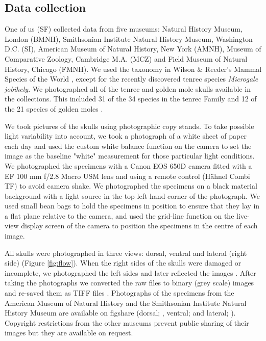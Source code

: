 \documentclass[12pt,a4paper]{article}
\begin{document}
\subsection{Data collection}
	One of us (SF) collected data from five museums: Natural History Museum, London (BMNH), Smithsonian Institute Natural History Museum, Washington D.C. (SI), American Museum of Natural History, New York (AMNH), Museum of Comparative Zoology, Cambridge M.A. (MCZ) and Field Museum of Natural History, Chicago (FMNH). We used the taxonomy in Wilson \& Reeder's Mammal Species of the World \citeyearpar{Wilson2005}, except for the recently discovered tenrec species \textit{Microgale jobihely}. We photographed all of the tenrec and golden mole skulls available in the collections. This included 31 of the 34 species in the tenrec Family \citep{Olson2013} and 12 of the 21 species of golden moles \citep{Wilson2005}.
	
	We took pictures of the skulls using photographic copy stands. To take possible light variability into account, we took a photograph of a white sheet of paper each day and used the custom white balance function on the camera to set the image as the baseline "white" measurement for those particular light conditions. We photographed the specimens with a Canon EOS 650D camera fitted with a EF 100 mm f/2.8 Macro USM lens and using a remote control (H\"ahnel Combi TF) to avoid camera shake. We photographed the specimens on a black material background with a light source in the top left-hand corner of the photograph. We used small bean bags to hold the specimens in position to ensure that they lay in a flat plane relative to the camera, and used the grid-line function on the live-view display screen of the camera to position the specimens in the centre of each image. 
	
	All skulls were photographed in three views: dorsal, ventral and lateral (right side) (Figure \ref{fig:flow}). When the right sides of the skulls were damaged or incomplete, we photographed the left sides and later reflected the images \citep[e.g.][]{Barrow2008}. After taking the photographs we converted the raw files to binary (grey scale) images and re-saved them as TIFF files \citep[uncompressed files preserve greater detail, ][]{RHOI2013}. Photographs of the specimens from the American Museum of Natural History and the Smithsonian Institute Natural History Museum are available on figshare (dorsal; \citet{Finlay2013d}, ventral; \citet{Finlay2013v} and lateral; \citet{Finlay2013l}). Copyright restrictions from the other museums prevent public sharing of their images but they are available on request.
\end{document}
